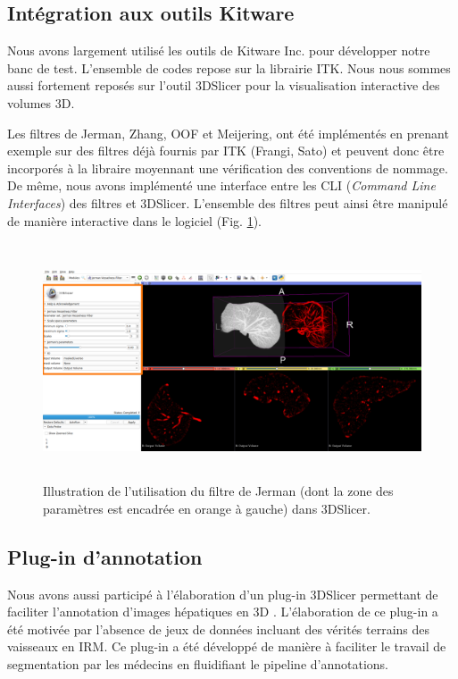 \subsection{Intégration aux outils Kitware}
Nous avons largement utilisé les outils de Kitware Inc. pour développer notre banc de test. L'ensemble de codes repose sur la librairie ITK. Nous nous sommes aussi fortement reposés sur l'outil 3DSlicer pour la visualisation interactive des volumes 3D.

Les filtres de Jerman, Zhang, OOF et Meijering, ont été implémentés en prenant exemple sur des filtres déjà fournis par ITK (Frangi, Sato) et peuvent donc être incorporés à la libraire moyennant une vérification des conventions de nommage. De même, nous avons implémenté une interface entre les CLI (\textit{Command Line Interfaces}) des filtres et 3DSlicer. L'ensemble des filtres peut ainsi être manipulé de manière interactive dans le logiciel (Fig. \ref{fig:slicer_vesselness}).
\begin{figure}[!ht]
    \includegraphics[height=7cm]{Images/slicer_jerman.png}
    \caption{Illustration de l'utilisation du filtre de Jerman (dont la zone des paramètres est encadrée en orange à gauche) dans 3DSlicer.}
    \label{fig:slicer_vesselness}
\end{figure}

\subsection{Plug-in d'annotation}
Nous avons aussi participé à l'élaboration d'un plug-in 3DSlicer permettant de faciliter l'annotation d'images hépatiques en 3D . L'élaboration de ce plug-in a été motivée par l'absence de jeux de données incluant des vérités terrains des vaisseaux en IRM. Ce plug-in a été développé de manière à faciliter le travail de segmentation par les médecins en fluidifiant le pipeline d'annotations.

